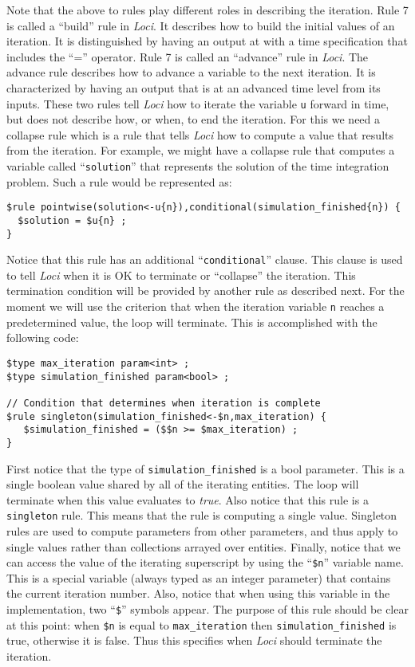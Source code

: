 \documentclass[10pt,epsf,letterpaper,twoside]{book}
\begin{document}
Note that the above to rules play different roles in describing the
iteration.  Rule 7 is called a ``build'' rule in {\it Loci}.  It describes
how to build the initial values of an iteration.  It is distinguished
by having an output at with a time specification that includes the
``='' operator.  Rule 7 is called an ``advance'' rule in {\it Loci}.  The
advance rule describes how to advance a variable to the next
iteration.  It is characterized by having an output that is at an
advanced time level from its inputs.  These two rules tell {\it Loci} how to
iterate the variable {\tt u} forward in time, but does not describe
how, or when, to end the iteration.  For this we need a collapse rule
which is a rule that tells {\it Loci} how to compute a value that results
from the iteration.  For example, we might have a collapse rule that
computes a variable called ``{\tt solution}'' that represents the
solution of the time integration problem.  Such a rule would be
represented as:
\begin{verbatim}
$rule pointwise(solution<-u{n}),conditional(simulation_finished{n}) {
  $solution = $u{n} ;
}
\end{verbatim}
Notice that this rule has an additional ``{\tt conditional}'' clause.
This clause is used to tell {\it Loci} when it is OK to terminate or
``collapse'' the iteration.  This termination condition will be
provided by another rule as described next.  For the moment we will
use the criterion that when the iteration variable {\tt n} reaches a
predetermined value, the loop will terminate.  This is accomplished
with the following code:

\begin{verbatim}
$type max_iteration param<int> ;
$type simulation_finished param<bool> ;

// Condition that determines when iteration is complete
$rule singleton(simulation_finished<-$n,max_iteration) {
   $simulation_finished = ($$n >= $max_iteration) ;
}
\end{verbatim}

First notice that the type of {\tt simulation\_finished} is a bool
parameter.  This is a single boolean value shared by all of the
iterating entities.  The loop will terminate when this value evaluates
to {\it true}.  Also notice that this rule is a {\tt singleton} rule.
This means that the rule is computing a single value.  Singleton rules
are used to compute parameters from other parameters, and thus apply
to single values rather than collections arrayed over entities.
Finally, notice that we can access the value of the iterating
superscript by using the ``{\tt \$n}'' variable name.  This is a
special variable (always typed as an integer parameter) that contains
the current iteration number.  Also, notice that when using this
variable in the implementation, two ``{\tt \$}'' symbols appear.  The
purpose of this rule should be clear at this point: when {\tt \$n} is
equal to {\tt max\_iteration} then {\tt simulation\_finished} is
true, otherwise it is false.  Thus this specifies when {\it Loci} should
terminate the iteration.
\end{document}
